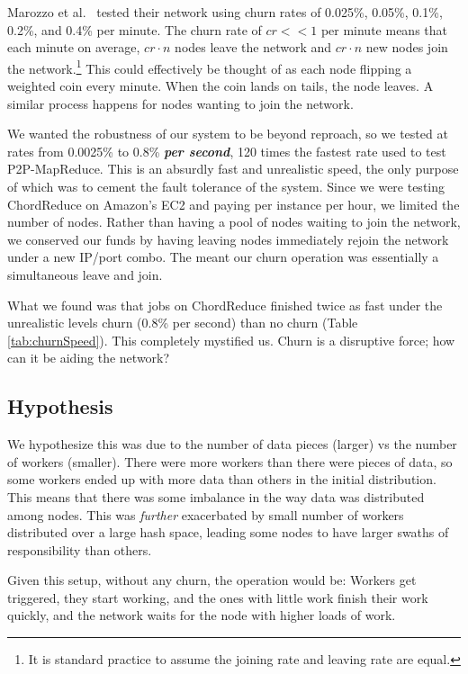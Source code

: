 Marozzo et al.\ \cite{marozzo2012p2p} tested their network using churn rates of 0.025\%, 0.05\%, 0.1\%, 0.2\%, and 0.4\% per minute.
The churn rate of $cr << 1$ per minute means that each minute on average, $cr \cdot n$ nodes leave the network and $cr \cdot n$  new nodes join the network.\footnote{It is standard practice to assume the joining rate and leaving rate are equal.}
This could effectively be thought of as each node flipping a weighted coin every minute.
When the coin lands on tails, the node leaves.
A similar process happens for nodes wanting to join the network.

We wanted the robustness of our system to be beyond reproach, so we tested at rates from 0.0025\% to 0.8\% \textbf{\textit{per second}}, 120 times the fastest rate used to test P2P-MapReduce.
This is an absurdly fast and unrealistic speed, the only purpose of which was to cement the fault tolerance of the system.
Since we were testing ChordReduce on Amazon's EC2 and paying per instance per hour, we limited the number of nodes.
Rather than having a pool of nodes waiting to join the network, we conserved our funds by having leaving nodes immediately rejoin the network under a new IP/port combo.
The meant our churn operation was essentially a simultaneous leave and join.


What we found was that jobs on ChordReduce finished twice as fast under the unrealistic levels churn (0.8\% per second) than no churn (Table \ref{tab:churnSpeed}).
This completely mystified us.
Churn is a disruptive force; how can it be aiding the network?

\subsection*{Hypothesis}
We hypothesize this was due to the number of data pieces (larger) vs the number of workers (smaller).
There were more workers than there were pieces of data, so some workers ended up with more data than others in the initial distribution.
This means that there was some imbalance in the way data was distributed among nodes.
This was \textit{further} exacerbated by small number of workers distributed over a large hash space, leading some nodes to have larger swaths of responsibility than others.

Given this setup, without any churn, the operation would be:
Workers get triggered, they start working, and the ones with little work finish their work quickly, and the network waits for the node with higher loads of work.

